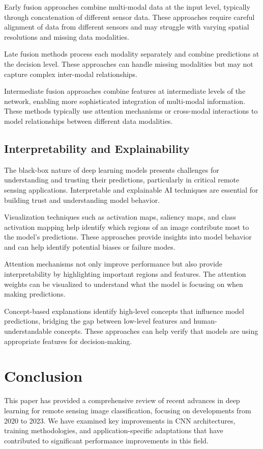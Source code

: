 \documentclass[12pt,a4paper]{article}
\begin{document}
Early fusion approaches combine multi-modal data at the input level, typically through concatenation of different sensor data. These approaches require careful alignment of data from different sensors and may struggle with varying spatial resolutions and missing data modalities.

Late fusion methods process each modality separately and combine predictions at the decision level. These approaches can handle missing modalities but may not capture complex inter-modal relationships.

Intermediate fusion approaches combine features at intermediate levels of the network, enabling more sophisticated integration of multi-modal information. These methods typically use attention mechanisms or cross-modal interactions to model relationships between different data modalities.

\subsection{Interpretability and Explainability}
The black-box nature of deep learning models presents challenges for understanding and trusting their predictions, particularly in critical remote sensing applications. Interpretable and explainable AI techniques are essential for building trust and understanding model behavior.

Visualization techniques such as activation maps, saliency maps, and class activation mapping help identify which regions of an image contribute most to the model's predictions. These approaches provide insights into model behavior and can help identify potential biases or failure modes.

Attention mechanisms not only improve performance but also provide interpretability by highlighting important regions and features. The attention weights can be visualized to understand what the model is focusing on when making predictions.

Concept-based explanations identify high-level concepts that influence model predictions, bridging the gap between low-level features and human-understandable concepts. These approaches can help verify that models are using appropriate features for decision-making.

\section{Conclusion}
\label{sec:conclusion}

This paper has provided a comprehensive review of recent advances in deep learning for remote sensing image classification, focusing on developments from 2020 to 2023. We have examined key improvements in CNN architectures, training methodologies, and application-specific adaptations that have contributed to significant performance improvements in this field.
\end{document}
